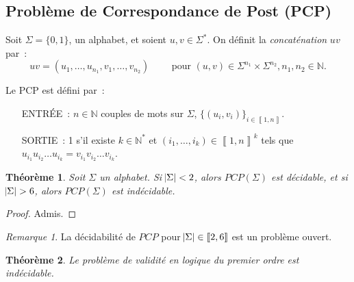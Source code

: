 \documentclass{article}
\newtheorem{thm}{Théorème}[section]
\theoremstyle{definition}
\theoremstyle{remark}
\newtheorem*{rmq}{Remarque}
\newcommand{\intint}[2]{\left\llbracket#1, #2\right\rrbracket}
\newcommand{\N}{\mathbb N}
\begin{document}
	\subsection{Problème de Correspondance de Post (PCP)}
		Soit $\Sigma = \{0, 1\}$, un alphabet, et soient $u, v \in \Sigma^*$. On définit la \textit{concaténation} $uv$ par~:
		\[uv = (u_1, \ldots, u_{n_1}, v_1, \ldots, v_{n_2})\qquad\text{ pour } (u, v) \in \Sigma^{n_1} \times \Sigma^{n_2}, n_1, n_2 \in \N.\]

		Le PCP est défini par~:
		\begin{itemize}
			\item[ENTRÉE~:] $n \in \N$ couples de mots sur $\Sigma$, $\{(u_i, v_i)\}_{i \in \intint 1n}$.
			\item[SORTIE~:] 1 s'il existe $k \in \N^*$ et $(i_1, \ldots, i_k) \in \intint 1n^k$ tels que $u_{i_1}u_{i_2}\ldots u_{i_k} = v_{i_1}v_{i_2}\ldots v_{i_k}$.
		\end{itemize}

		\begin{thm} Soit $\Sigma$ un alphabet. Si $\abs \Sigma < 2$, alors $PCP(\Sigma)$ est décidable, et si $\abs \Sigma > 6$, alors $PCP(\Sigma)$ est indécidable.
		\end{thm}

		\begin{proof} Admis.
		\end{proof}

		\begin{rmq} La décidabilité de $PCP$ pour $\abs \Sigma \in \intint 26$ est un problème ouvert.
		\end{rmq}

		\begin{thm} Le problème de validité en logique du premier ordre est indécidable.
		\end{thm}
\end{document}
